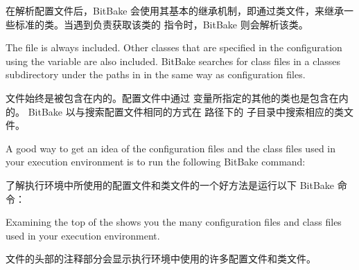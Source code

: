 在解析配置文件后，BitBake 会使用其基本的继承机制，即通过类文件，来继承一些标准的类。当遇到负责获取该类的  指令时，BitBake 则会解析该类。

The  file is always included. Other classes that are specified in the configuration using the  variable are also included. BitBake searches for class files in a classes subdirectory under the paths in  in the same way as configuration files.

 文件始终是被包含在内的。配置文件中通过  变量所指定的其他的类也是包含在内的。 BitBake 以与搜索配置文件相同的方式在 路径下的  子目录中搜索相应的类文件。

A good way to get an idea of the configuration files and the class files used in your execution environment is to run the following BitBake command:

了解执行环境中所使用的配置文件和类文件的一个好方法是运行以下 BitBake 命令：


Examining the top of the  shows you the many configuration files and class files used in your execution environment.

 文件的头部的注释部分会显示执行环境中使用的许多配置文件和类文件。

